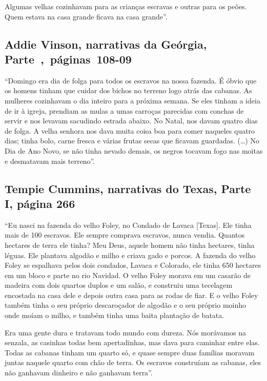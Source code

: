 Algumas velhas cozinhavam para as crianças escravas e outras para os
peões. Quem estava na casa grande ficava na casa grande''.

\subsection{Addie Vinson, narrativas da Geórgia, Parte~,~páginas~108-09}
\label{ref266}

``Domingo era dia de folga para todos os escravos na nossa fazenda. É
óbvio que os homens tinham que cuidar dos bichos no terreno logo atrás
das cabanas. As mulheres cozinhavam o dia inteiro para a próxima semana.
Se eles tinham a ideia de ir à igreja, prendiam as mulas a umas carroças
parecidas com conchas de servir e nos levavam sacudindo estrada abaixo.
No Natal, nos davam quatro dias de folga. A velha senhora nos dava muita
coisa boa para comer naqueles quatro dias; tinha bolo, carne fresca e
várias frutas secas que ficavam guardadas. (\ldots{}) No Dia de Ano
Novo, se não tinha nevado demais, os negros tocavam fogo nas moitas e
desmatavam mais terreno''.

\subsection{Tempie Cummins, narrativas do Texas, Parte I, página 266} \label{ref64}

``Eu nasci na fazenda do velho Foley, no Condado de Lavaca {[}Texas{]}.
Ele tinha mais de 100 escravos. Ele sempre comprava escravos, nunca
vendia. Quantos hectares de terra ele tinha? Meu Deus, aquele homem não
tinha hectares, tinha léguas. Ele plantava algodão e milho e criava gado
e porcos. A fazenda do velho Foley se espalhava pelos dois condados,
Lavaca e Colorado, ele tinha 650 hectares em um bloco e parte no rio
Navidad. O velho Foley morava em um casarão de madeira com dois quartos
duplos e um salão, e construiu uma tecelagem encostada na casa dele e
depois outra casa para as rodas de fiar. E o velho Foley também tinha o
seu próprio descaroçador de algodão e o seu próprio moinho onde moíam o
milho, e também tinha uma baita plantação de batata.

Era uma gente dura e tratavam todo mundo com dureza. Nós morávamos na
senzala, as casinhas todas bem apertadinhas, mas dava para caminhar
entre elas. Todas as cabanas tinham um quarto só, e quase sempre duas
famílias moravam juntas naquele quarto com chão de terra. Os escravos
construíam as cabanas, eles não ganhavam dinheiro e não ganhavam
terra''.

